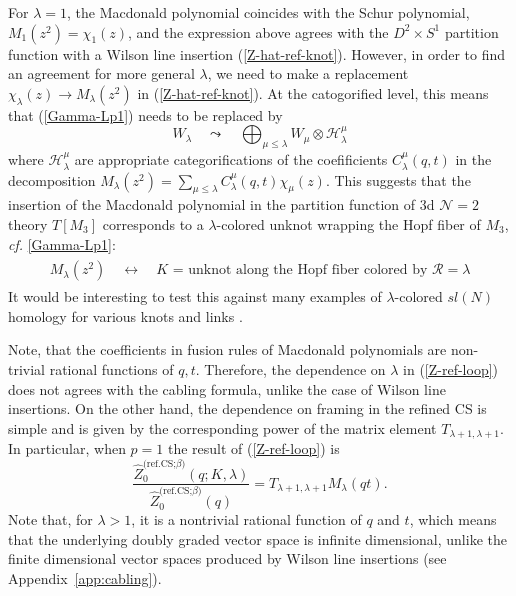 \documentclass[hyper,letterpaper]{JHEP3}
\newcommand{\be}{\begin{equation}}
\newcommand{\ee}{\end{equation}}
\renewcommand{\hat}{\widehat}
\def\CH{{\mathcal H}}
\def\CN{{\mathcal N}}
\def\CR{{\mathcal R}}
\begin{document}
For $\lambda=1$, the Macdonald polynomial coincides with the Schur polynomial, $M_1(z^2)=\chi_1(z)$,
and the expression above agrees with the $D^2\times S^1$ partition function with a Wilson line insertion (\ref{Z-hat-ref-knot}).
However, in order to find an agreement for more general $\lambda$,
we need to make a replacement $\chi_\lambda(z)\rightarrow M_\lambda(z^2)$ in (\ref{Z-hat-ref-knot}).
At the catogorified level, this means that (\ref{Gamma-Lp1}) needs to be replaced by
\begin{equation}
W_{\lambda} \quad \leadsto \quad \bigoplus_{\mu\leq \lambda} W_\mu\otimes \CH_\lambda^\mu
\end{equation}
where $\CH_\lambda^\mu$ are appropriate categorifications of the coefificients $C^\mu_\lambda(q,t)$ in the decomposition $M_\lambda(z^2)=\sum_{\mu\leq \lambda}C^\mu_\lambda(q,t)\chi_\mu(z)$.
This suggests that the insertion of the Macdonald polynomial in the partition function of 3d $\CN=2$ theory $T[M_3]$
corresponds to a $\lambda$-colored unknot wrapping the Hopf fiber of $M_3$, {\it cf.} \eqref{Gamma-Lp1}:
\be
\boxed{\phantom{\int}
M_\lambda(z^2) \quad \leftrightarrow \quad \text{$K$ = unknot along the Hopf fiber colored by $\CR = \lambda$}
\phantom{\int}}
\ee
It would be interesting to test this against many examples of $\lambda$-colored $sl(N)$ homology for various knots
and links \cite{Gukov:2011ry,Cherednik:2011nr,Fuji:2012pm,Itoyama:2012fq,Gukov:2015gmm,Wedrich:2016smm,Kononov:2016cwp}.

Note, that the coefficients in fusion rules of Macdonald polynomials are non-trivial rational functions of $q,t$.
Therefore, the dependence on $\lambda$ in (\ref{Z-ref-loop}) does not agrees with the cabling formula,
unlike the case of Wilson line insertions.
On the other hand, the dependence on framing in the refined CS is simple and is given
by the corresponding power of the matrix element $T_{\lambda+1,\lambda+1}$.
In particular, when $p=1$ the result of (\ref{Z-ref-loop}) is
\begin{equation}
	\frac{\hat{Z}^\text{(ref.CS;$\beta$)}_0(q;K,\lambda)}{\hat{Z}^\text{(ref.CS;$\beta$)}_0(q)}=T_{\lambda+1,\lambda+1}M_\lambda(qt).
\end{equation}
Note that, for $\lambda>1$, it is a nontrivial rational function of $q$ and $t$,
which means that the underlying doubly graded vector space is infinite dimensional,
unlike the finite dimensional vector spaces produced by Wilson line insertions (see Appendix~\ref{app:cabling}).

\end{document}

